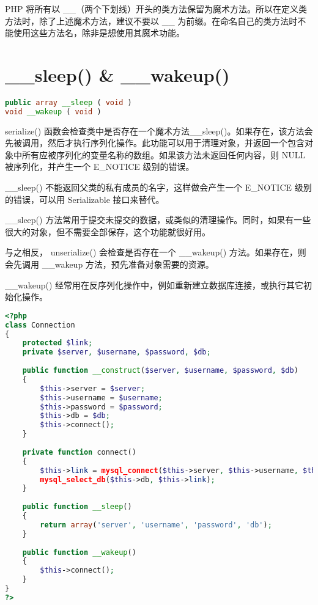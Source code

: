 PHP 将所有以 \_\_（两个下划线）开头的类方法保留为魔术方法。所以在定义类方法时，除了上述魔术方法，建议不要以 \_\_ 为前缀。在命名自己的类方法时不能使用这些方法名，除非是想使用其魔术功能。


\section{\_\_sleep() \& \_\_wakeup()}


\begin{lstlisting}[language=PHP]
public array __sleep ( void )
void __wakeup ( void )
\end{lstlisting}

serialize() 函数会检查类中是否存在一个魔术方法\_\_sleep()。如果存在，该方法会先被调用，然后才执行序列化操作。此功能可以用于清理对象，并返回一个包含对象中所有应被序列化的变量名称的数组。如果该方法未返回任何内容，则 NULL 被序列化，并产生一个 E\_NOTICE 级别的错误。

\_\_sleep() 不能返回父类的私有成员的名字，这样做会产生一个 E\_NOTICE 级别的错误，可以用 Serializable 接口来替代。

\_\_sleep() 方法常用于提交未提交的数据，或类似的清理操作。同时，如果有一些很大的对象，但不需要全部保存，这个功能就很好用。

与之相反， unserialize() 会检查是否存在一个 \_\_wakeup() 方法。如果存在，则会先调用 \_\_wakeup 方法，预先准备对象需要的资源。

\_\_wakeup() 经常用在反序列化操作中，例如重新建立数据库连接，或执行其它初始化操作。


\begin{lstlisting}[language=PHP]
<?php
class Connection 
{
    protected $link;
    private $server, $username, $password, $db;
    
    public function __construct($server, $username, $password, $db)
    {
        $this->server = $server;
        $this->username = $username;
        $this->password = $password;
        $this->db = $db;
        $this->connect();
    }
    
    private function connect()
    {
        $this->link = mysql_connect($this->server, $this->username, $this->password);
        mysql_select_db($this->db, $this->link);
    }
    
    public function __sleep()
    {
        return array('server', 'username', 'password', 'db');
    }
    
    public function __wakeup()
    {
        $this->connect();
    }
}
?>
\end{lstlisting}

